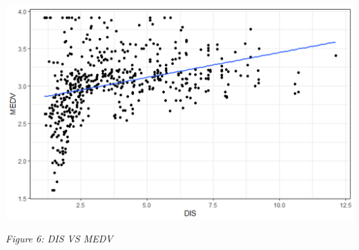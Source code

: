 \documentclass[a4paper,9pt,twocolumn,twoside,]{pinp}
\begin{document}
\begin{center}\includegraphics[width=0.95\linewidth]{inference_dis_graph} \end{center}

\emph{Figure 6: DIS VS MEDV} \newline





\end{document}
